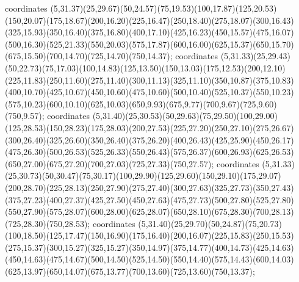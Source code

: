  coordinates {(5,31.37)(25,29.67)(50,24.57)(75,19.53)(100,17.87)(125,20.53)(150,20.07)(175,18.67)(200,16.20)(225,16.47)(250,18.40)(275,18.07)(300,16.43)(325,15.93)(350,16.40)(375,16.80)(400,17.10)(425,16.23)(450,15.57)(475,16.07)(500,16.30)(525,21.33)(550,20.03)(575,17.87)(600,16.00)(625,15.37)(650,15.70)(675,15.50)(700,14.70)(725,14.70)(750,14.37)};
 coordinates {(5,31.33)(25,29.43)(50,22.73)(75,17.03)(100,14.83)(125,13.50)(150,13.03)(175,12.53)(200,12.10)(225,11.83)(250,11.60)(275,11.40)(300,11.13)(325,11.10)(350,10.87)(375,10.83)(400,10.70)(425,10.67)(450,10.60)(475,10.60)(500,10.40)(525,10.37)(550,10.23)(575,10.23)(600,10.10)(625,10.03)(650,9.93)(675,9.77)(700,9.67)(725,9.60)(750,9.57)};
 coordinates {(5,31.40)(25,30.53)(50,29.63)(75,29.50)(100,29.00)(125,28.53)(150,28.23)(175,28.03)(200,27.53)(225,27.20)(250,27.10)(275,26.67)(300,26.40)(325,26.60)(350,26.40)(375,26.20)(400,26.43)(425,25.90)(450,26.17)(475,26.30)(500,26.53)(525,26.33)(550,26.43)(575,26.37)(600,26.93)(625,26.53)(650,27.00)(675,27.20)(700,27.03)(725,27.33)(750,27.57)};
 coordinates {(5,31.33)(25,30.73)(50,30.47)(75,30.17)(100,29.90)(125,29.60)(150,29.10)(175,29.07)(200,28.70)(225,28.13)(250,27.90)(275,27.40)(300,27.63)(325,27.73)(350,27.43)(375,27.23)(400,27.37)(425,27.50)(450,27.63)(475,27.73)(500,27.80)(525,27.80)(550,27.90)(575,28.07)(600,28.00)(625,28.07)(650,28.10)(675,28.30)(700,28.13)(725,28.30)(750,28.53)};
 coordinates {(5,31.40)(25,29.70)(50,24.87)(75,20.73)(100,18.50)(125,17.47)(150,16.90)(175,16.40)(200,16.07)(225,15.83)(250,15.53)(275,15.37)(300,15.27)(325,15.27)(350,14.97)(375,14.77)(400,14.73)(425,14.63)(450,14.63)(475,14.67)(500,14.50)(525,14.50)(550,14.40)(575,14.43)(600,14.03)(625,13.97)(650,14.07)(675,13.77)(700,13.60)(725,13.60)(750,13.37)};

